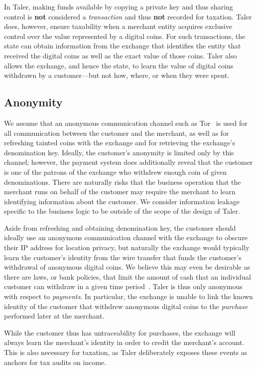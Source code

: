 \documentclass{llncs}
\begin{document}
In Taler, making funds available by copying a private key and thus
sharing control is {\bf not} considered a {\em transaction} and thus
{\bf not} recorded for taxation.  Taler does, however, ensure
taxability when a merchant entity acquires exclusive control over the
value represented by a digital coins.  For such transactions, the state
can obtain information from the exchange that identifies
the entity that received the digital coins as well as the exact value
of those coins.  Taler also allows the exchange, and hence the state,
to learn the value of digital coins withdrawn by a customer---but not
how, where, or when they were spent.

\subsection{Anonymity}

We assume that an anonymous communication channel
such as Tor~\cite{tor-design} is
used for all communication between the customer and the merchant,
as well as for refreshing tainted coins with the exchange and for
retrieving the exchange's denomination key.
Ideally, the customer's anonymity is limited only by this channel;
however, the payment system does additionally reveal that the customer
is one of the patrons of the exchange who withdrew enough coin of
given denominations.
There are naturally risks that the business operation that the
merchant runs on behalf of the customer
may require the merchant to learn identifying information about the customer.
We consider information leakage specific to the business logic to be
outside of the scope of the design of Taler.

Aside from refreshing and obtaining denomination key, the customer
should ideally use an anonymous communication channel with the exchange
to obscure their IP address for location privacy, but naturally
the exchange would typically learn the customer's identity from the wire
transfer that funds the customer's withdrawal of anonymous digital coins.
We believe this may even be desirable as there are laws, or bank policies,
that limit the amount of cash that an individual customer can withdraw
in a given time period~\cite{france2015cash,greece2015cash}.
Taler is thus only anonymous with respect to {\em payments}.
In particular, the exchange
is unable to link the known identity of the customer that withdrew
anonymous digital coins to the {\em purchase} performed later at the
merchant.

While the customer thus has untraceability for purchases, the exchange will
always learn the merchant's identity in order to credit the merchant's
account.  This is also necessary for taxation, as Taler deliberately
exposes these events as anchors for tax audits on income.
\end{document}

